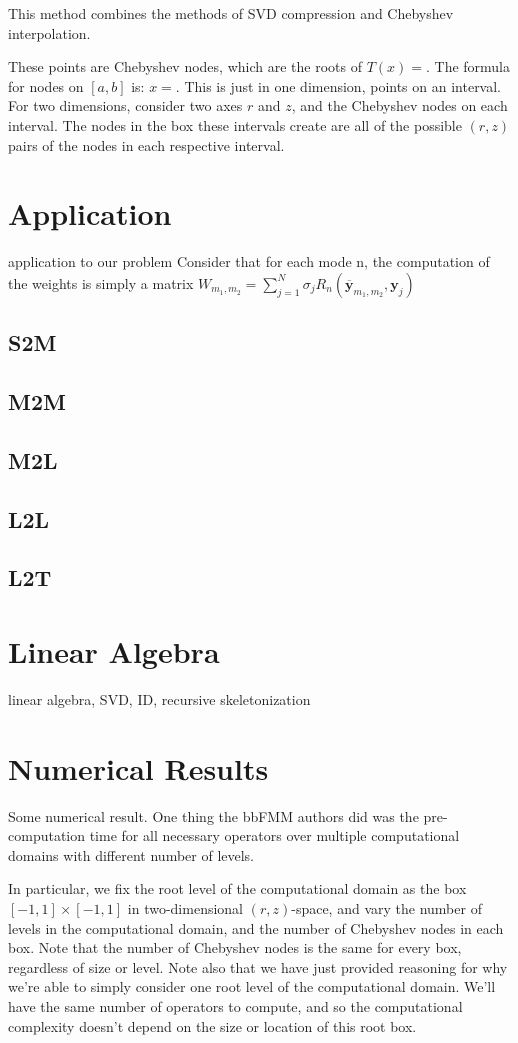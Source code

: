 \documentclass[11pt, oneside]{article}   	%
\begin{document}
This method combines the methods of SVD compression and Chebyshev interpolation.

These points are Chebyshev nodes, which are the roots of $T(x)=$. The formula for nodes on $[a,b]$ is: $x=$. This is just in one dimension, points on an interval. For two dimensions, consider two axes $r$ and $z$, and the Chebyshev nodes on each interval. The nodes in the box these intervals create are all of the possible $(r,z)$ pairs of the nodes in each respective interval.

\section{Application}
application to our problem
Consider that for each mode n, the computation of the weights is simply a matrix
$W_{m_1,m_2}=\sum_{j=1}^N \sigma_j R_n(\mathbf{\overline{y}}_{m_1,m_2},\mathbf{y}_j)$
\subsection{S2M}
\subsection{M2M}
\subsection{M2L}
\subsection{L2L}
\subsection{L2T}
\section{Linear Algebra}
linear algebra, SVD, ID, recursive skeletonization

\section{Numerical Results}
Some numerical result. One thing the bbFMM authors did was the pre-computation time for all necessary operators over multiple computational domains with different number of levels.

In particular, we fix the root level of the computational domain as the box $[-1,1]\times [-1,1]$ in two-dimensional $(r,z)$-space, and vary the number of levels in the computational domain, and the number of Chebyshev nodes in each box. Note that the number of Chebyshev nodes is the same for every box, regardless of size or level. Note also that we have just provided reasoning for why we're able to simply consider one root level of the computational domain. We'll have the same number of operators to compute, and so the computational complexity doesn't depend on the size or location of this root box.
\end{document}
